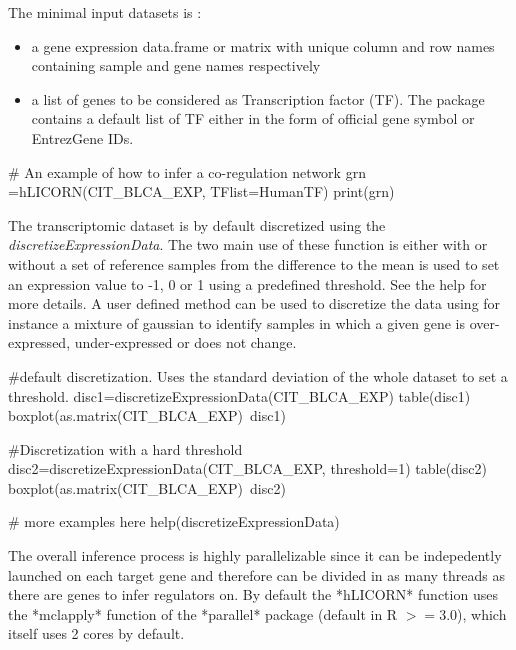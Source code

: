 \documentclass[12pt]{article}
\begin{document}
The minimal input datasets is :
\begin{itemize}
\item a gene expression data.frame or
matrix with unique column and row names containing sample and gene names
respectively 
\item a list of genes to be considered as Transcription factor
(TF). The package contains a default list of TF either in the form of
official gene symbol or EntrezGene IDs.
\end{itemize}

\begin{Schunk}
\begin{Sinput}
    # An example of how to infer a co-regulation network
    grn =hLICORN(CIT_BLCA_EXP, TFlist=HumanTF)
    print(grn)
\end{Sinput}
\end{Schunk}

The transcriptomic dataset is by default discretized using the
\textit{discretizeExpressionData}. The two main use of these function is either
with or without a set of reference samples from the difference to the
mean is used to set an expression value to -1, 0 or 1 using a predefined
threshold. See the help for more details. A user defined method can be
used to discretize the data using for instance a mixture of gaussian to
identify samples in which a given gene is over-expressed,
under-expressed or does not change.

\begin{Schunk}
\begin{Sinput}
    #default discretization. Uses the standard deviation of the whole dataset to set a threshold.
    disc1=discretizeExpressionData(CIT_BLCA_EXP)
    table(disc1)
    boxplot(as.matrix(CIT_BLCA_EXP)~disc1)

    #Discretization with a hard threshold
    disc2=discretizeExpressionData(CIT_BLCA_EXP, threshold=1)
    table(disc2)
    boxplot(as.matrix(CIT_BLCA_EXP)~disc2)

    # more examples here
    help(discretizeExpressionData)

\end{Sinput}
\end{Schunk}


The overall inference process is highly parallelizable since it can be
indepedently launched on each target gene and therefore can be divided
in as many threads as there are genes to infer regulators on. By default
the *hLICORN* function uses the *mclapply* function of the *parallel*
package (default in R $>= 3.0$), which itself uses 2 cores by default.
\end{document}
